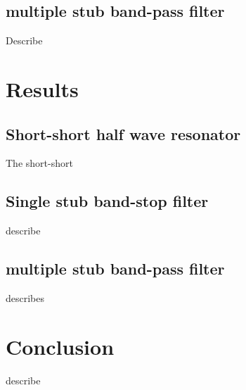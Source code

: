 \documentclass[letterpaper, 12pt]{article}
\begin{document}
\subsection{multiple stub band-pass filter}
Describe
\section{Results}

\subsection{Short-short half wave resonator}
The short-short 


\subsection{Single stub band-stop filter}
describe
\subsection{multiple stub band-pass filter}
describes

\section{Conclusion}
describe
\end{document}
